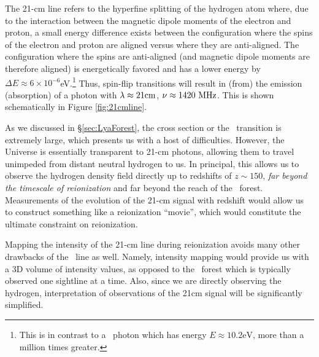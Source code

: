 The 21-cm line refers to the hyperfine splitting of the hydrogen atom where, due to the interaction between the magnetic dipole moments of the electron and proton, a small energy difference exists between the configuration where the spins of the electron and proton are aligned versus where they are anti-aligned. The configuration where the spins are anti-aligned (and magnetic dipole moments are therefore aligned) is energetically favored and has a lower energy by $\Delta E \approx 6\times 10^{-6}$eV.\footnote{This is in contrast to a \lya\ photon which has energy $E \approx 10.2\text{eV}$, more than a million times greater.} Thus, spin-flip transitions will result in (from) the emission (absorption) of a photon with $\lambda \approx 21\text{cm}$, $\nu \approx 1420\ \text{MHz}$. This is shown schematically in Figure \ref{fig:21cmline}. 


As we discussed in \S \ref{sec:LyaForest}, the cross section or the \lya\ transition is extremely large, which presents us with a host of difficulties.  However, the Universe is essentially transparent to 21-cm photons, allowing them to travel unimpeded from distant neutral hydrogen to us. In principal, this allows us to observe the hydrogen density field directly up to redshifts of $z \sim 150$, \textit{far beyond the timescale of reionization} and far beyond the reach of the \lya\ forest. Measurements of the evolution of the 21-cm signal with redshift would allow us to construct something like a reionization ``movie'', which would constitute the ultimate constraint on reionization. 


Mapping the intensity of the 21-cm line during reionization avoids many other drawbacks of the \lya\ line as well. Namely, intensity mapping would provide us with a 3D volume of intensity values, as opposed to the \lya\ forest which is typically observed one sightline at a time. Also, since we are directly observing the hydrogen, interpretation of observations of the 21cm signal will be significantly simplified.

